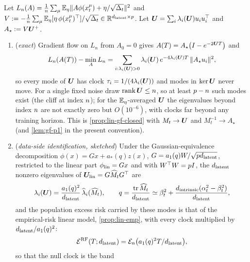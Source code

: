 \begin{corollary}\label{cor:lin-rfnn}
Let $L_n(A)=\frac1n\sum_{\mu}\mathbb{E}_\eta\|A\phi(x_t^\mu)+\eta/\sqrt{\Delta_t}\|^2$ and $V:=-\frac1n\sum_\mu\mathbb{E}_\eta[\eta\,\phi(x_t^\mu)^{\top}]/\sqrt{\Delta_t}\in\mathbb{R}^{d_{\mathrm{latent}}\times p}$. Let $\bm{U}=\sum_{i}\lambda_i(\bm{U})u_iu_i^{\top}$ and $A_\star:=V\bm{U}^{+}$.
\begin{enumerate}
\item[(a)] (\emph{exact}) Gradient flow on $L_n$ from $A_0=0$ gives $A(T)=A_\star\big(I-e^{-2\bm{U} T}\big)$ and
\begin{equation}\label{eq:rfnn-excess}
L_n(A(T))-\min_AL_n=\sum_{i:\lambda_i(\bm{U})>0}\lambda_i(\bm{U})\,e^{-4\lambda_i(\bm{U})T}\,\|A_\star u_i\|^2 ,
\end{equation}
so every mode of $\bm{U}$ has clock $\tau_i=1/(4\lambda_i(\bm{U}))$ and modes in $\ker\bm{U}$ never move. For a single fixed noise draw $\operatorname{rank}\bm{U}\le n$, so at least $p-n$ such modes exist (the cliff at index $n$); for the $\mathbb{E}_\eta$-averaged $\bm{U}$ the eigenvalues beyond index $n$ are not exactly zero but $O(10^{-6})$, with clocks far beyond any training horizon. This is \cref{prop:lin-gf-closed} with $M_t\to\bm{U}$ and $M_t^{-1}\to A_\star$ (and \cref{lem:gf-p1} in the present convention).
\item[(b)] (\emph{data-side identification, sketched}) Under the Gaussian-equivalence decomposition $\phi(x)=Gx+a_*(q)z(x)$, $G=a_1(q)W/\sqrt{pd_{\mathrm{latent}}}$, restricted to the linear part $\phi_{\rm lin}=Gx$ and with $W^{\top}W=p I$, the $d_{\mathrm{latent}}$ nonzero eigenvalues of $\bm{U}_{\rm lin}=G\widehat M_tG^{\top}$ are
\begin{equation}\label{eq:rfnn-eig-id}
\lambda_i(\bm{U})=\frac{a_1(q)^2}{d_{\mathrm{latent}}}\,\widehat\lambda_i(\widehat M_t),\qquad q=\frac{\operatorname{tr}\widehat M_t}{d_{\mathrm{latent}}}\simeq\beta_t^2+\frac{d_{\mathrm{intrinsic}}(\alpha_t^2-\beta_t^2)}{d_{\mathrm{latent}}},
\end{equation}
and the population excess risk carried by these modes is that of the empirical-risk linear model, \cref{prop:lin-emp}, with every clock multiplied by $d_{\mathrm{latent}}/a_1(q)^2$:
\begin{equation}\label{eq:rfnn-risk-id}
\mathcal E^{\rm RF}(T;d_{\mathrm{latent}})=\mathcal E_n\big(a_1(q)^2T/d_{\mathrm{latent}}\big),
\end{equation}
so that the null clock is the band
\begin{equation}\label{eq:rfnn-null-clock}
\begin{aligned}

\end{aligned}
\end{equation}
\end{enumerate}
\end{corollary}
